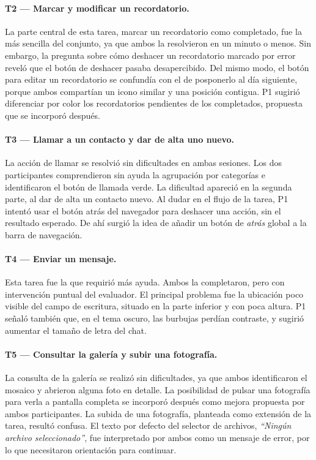 \paragraph{T2 — Marcar y modificar un recordatorio.}
La parte central de esta tarea, marcar un recordatorio como completado, fue
la más sencilla del conjunto, ya que ambos la resolvieron en un minuto o
menos. Sin embargo, la pregunta sobre cómo deshacer un recordatorio marcado
por error reveló que el botón de deshacer pasaba desapercibido. Del mismo
modo, el botón para editar un recordatorio se confundía con el de posponerlo
al día siguiente, porque ambos compartían un icono similar y una posición
contigua. P1 sugirió diferenciar por color los recordatorios pendientes de
los completados, propuesta que se incorporó después.

\paragraph{T3 — Llamar a un contacto y dar de alta uno nuevo.}
La acción de llamar se resolvió sin dificultades en ambas sesiones. Los dos
participantes comprendieron sin ayuda la agrupación por categorías e
identificaron el botón de llamada verde. La dificultad apareció en la
segunda parte, al dar de alta un contacto nuevo. Al dudar en el flujo de la
tarea, P1 intentó usar el botón atrás del navegador para deshacer una
acción, sin el resultado esperado. De ahí surgió la idea de añadir un botón
de \emph{atrás} global a la barra de navegación.

\paragraph{T4 — Enviar un mensaje.}
Esta tarea fue la que requirió más ayuda. Ambos la completaron, pero con
intervención puntual del evaluador. El principal problema fue la ubicación
poco visible del campo de escritura, situado en la parte inferior y con
poca altura. P1 señaló también que, en el tema oscuro, las burbujas perdían
contraste, y sugirió aumentar el tamaño de letra del chat.

\paragraph{T5 — Consultar la galería y subir una fotografía.}
La consulta de la galería se realizó sin dificultades, ya que ambos
identificaron el mosaico y abrieron alguna foto en detalle. La posibilidad
de pulsar una fotografía para verla a pantalla completa se incorporó
después como mejora propuesta por ambos participantes. La subida de una
fotografía, planteada como extensión de la tarea, resultó confusa. El texto
por defecto del selector de archivos, \emph{``Ningún archivo
seleccionado''}, fue interpretado por ambos como un mensaje de error, por
lo que necesitaron orientación para continuar.

